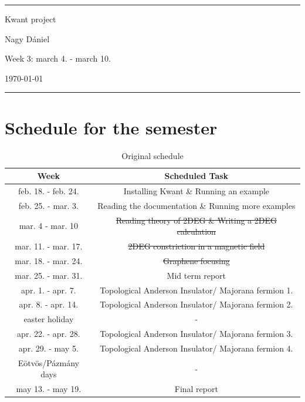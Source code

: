 \documentclass[12pt]{article}
\numberwithin{equation}{section}
\begin{document}
\begin{center}

\thispagestyle{empty}

\rule{10 cm}{2pt}

\vspace{1.5cm}
{ \Large Kwant project}

\vspace{1.0cm}
Nagy Dániel

\vspace{0.5cm}
Week 3: march 4. - march 10.

\vspace{0.5cm}
\today

\vspace{0.25cm}
\rule{10 cm}{2pt}

\end{center}
\newpage

\newpage
{}

\section{Schedule for the semester}
\begin{table}[ht]
  \centering
  \caption{Original schedule}
  \begin{tabular}{|c|c|}
  \hline
  Week & Scheduled Task \\ [0.5ex]  \hline %
  feb. 18. - feb. 24. & Installing Kwant \& Running an example \\ \hline
  feb. 25. - mar. 3. & Reading the documentation \& Running more examples \\ \hline
  mar. 4 - mar. 10 & \st{Reading theory of 2DEG \& Writing a 2DEG calculation} \\ \hline 
  mar. 11. - mar. 17. & \st{2DEG constriction in a magnetic field} \\ \hline
  mar. 18. -  mar. 24. & \st{Graphene focusing} \\ \hline
  mar. 25. -  mar. 31. & Mid term report \\ \hline
  apr. 1. -  apr. 7. & Topological Anderson Insulator/ Majorana fermion 1. \\ \hline
  apr. 8. -  apr. 14. & Topological Anderson Insulator/ Majorana fermion 2. \\ \hline
  easter holiday & - \\ \hline
  apr. 22. - apr. 28. & Topological Anderson Insulator/ Majorana fermion 3. \\ \hline 
  apr. 29. - may 5. & Topological Anderson Insulator/ Majorana fermion 4. \\ \hline 
  Eötvös/Pázmány days & - \\ \hline
  may 13. - may 19. & Final report \\ \hline

  \end{tabular}
\end{table}
\end{document}
